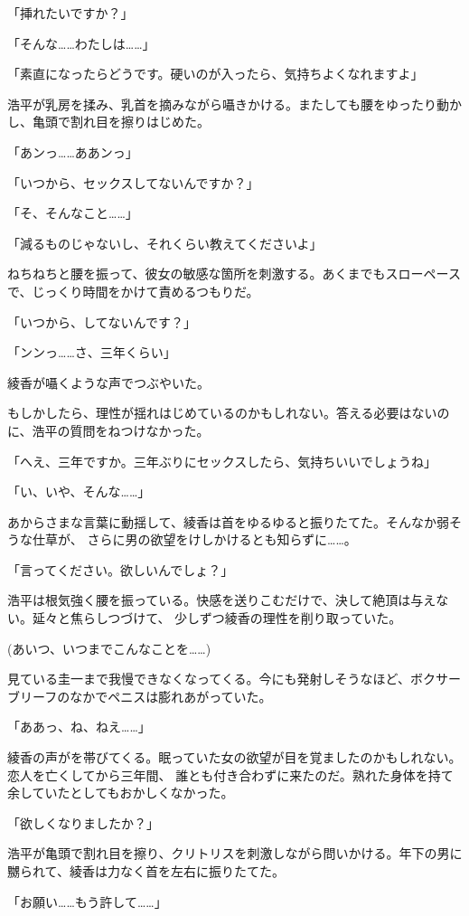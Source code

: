 ﻿\documentclass[
    book,tate,
    line_length=30zw,
    jafontsize=12pt,
    paper=b5j,
    landscape,
    ]{jlreq}
\begin{document}
「挿れたいですか？」

「そんな……わたしは……」

「素直になったらどうです。硬いのが入ったら、気持ちよくなれますよ」

浩平が乳房を揉み、乳首を摘みながら囁きかける。またしても腰をゆったり動かし、亀頭で割れ目を擦りはじめた。

「あンっ……ああンっ」

「いつから、セックスしてないんですか？」

「そ、そんなこと……」

「減るものじゃないし、それくらい教えてくださいよ」

ねちねちと腰を振って、彼女の敏感な箇所を刺激する。あくまでもスローペースで、じっくり時間をかけて責めるつもりだ。

「いつから、してないんです？」

「ンンっ……さ、三年くらい」

綾香が囁くような声でつぶやいた。

もしかしたら、理性が揺れはじめているのかもしれない。答える必要はないのに、浩平の質問をねつけなかった。

「へえ、三年ですか。三年ぶりにセックスしたら、気持ちいいでしょうね」

「い、いや、そんな……」

あからさまな言葉に動揺して、綾香は首をゆるゆると振りたてた。そんなか弱そうな仕草が、
さらに男の欲望をけしかけるとも知らずに……。

「言ってください。欲しいんでしょ？」

浩平は根気強く腰を振っている。快感を送りこむだけで、決して絶頂は与えない。延々と焦らしつづけて、
少しずつ綾香の理性を削り取っていた。

(あいつ、いつまでこんなことを……)

見ている圭一まで我慢できなくなってくる。今にも発射しそうなほど、ボクサーブリーフのなかでペニスは膨れあがっていた。

「ああっ、ね、ねえ……」

綾香の声がを帯びてくる。眠っていた女の欲望が目を覚ましたのかもしれない。恋人を亡くしてから三年間、
誰とも付き合わずに来たのだ。熟れた身体を持て余していたとしてもおかしくなかった。

「欲しくなりましたか？」

浩平が亀頭で割れ目を擦り、クリトリスを刺激しながら問いかける。年下の男に嬲られて、綾香は力なく首を左右に振りたてた。

「お願い……もう許して……」
\end{document}
